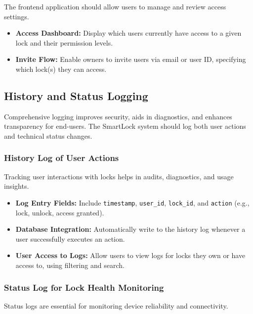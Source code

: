 The frontend application should allow users to manage and review access settings.

\begin{itemize}
  \item \textbf{Access Dashboard:} Display which users currently have access to a given lock and their permission levels.
  \item \textbf{Invite Flow:} Enable owners to invite users via email or user ID, specifying which lock(s) they can access.
\end{itemize}

%
%
%
%

\newpage
\subsection{History and Status Logging}

Comprehensive logging improves security, aids in diagnostics, and enhances transparency for end-users. The SmartLock system should log both user actions and technical status changes.

\subsubsection{History Log of User Actions}

Tracking user interactions with locks helps in audits, diagnostics, and usage insights.

\begin{itemize}
  \item \textbf{Log Entry Fields:} Include \texttt{timestamp}, \texttt{user\_id}, \texttt{lock\_id}, and \texttt{action} (e.g., lock, unlock, access granted).
  \item \textbf{Database Integration:} Automatically write to the history log whenever a user successfully executes an action.
  \item \textbf{User Access to Logs:} Allow users to view logs for locks they own or have access to, using filtering and search.
\end{itemize}

\subsubsection{Status Log for Lock Health Monitoring}

Status logs are essential for monitoring device reliability and connectivity.

